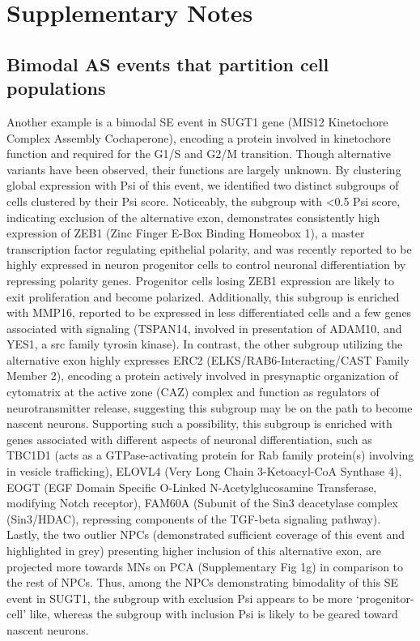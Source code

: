 \section{Supplementary Notes}

\subsection{Bimodal AS events that partition cell populations}

Another example is a bimodal SE event in SUGT1 gene (MIS12 Kinetochore Complex Assembly Cochaperone), encoding a protein involved in kinetochore function and required for the G1/S and G2/M transition. Though alternative variants have been observed, their functions are largely unknown. By clustering global expression with Psi of this event, we identified two distinct subgroups of cells clustered by their Psi score. Noticeably, the subgroup with <0.5 Psi score, indicating exclusion of the alternative exon, demonstrates consistently high expression of ZEB1 (Zinc Finger E-Box Binding Homeobox 1), a master transcription factor regulating epithelial polarity, and was recently reported to be highly expressed in neuron progenitor cells to control neuronal differentiation by repressing polarity genes. Progenitor cells losing ZEB1 expression are likely to exit proliferation and become polarized\cite{Singh:2016iz}. Additionally, this subgroup is enriched with MMP16, reported to be expressed in less differentiated cells\cite{Astarci:2012bk} and a few genes associated with signaling (TSPAN14, involved in presentation of ADAM10, and YES1, a src family tyrosin kinase). In contrast, the other subgroup utilizing the alternative exon highly expresses ERC2 (ELKS/RAB6-Interacting/CAST Family Member 2), encoding a protein actively involved in presynaptic organization of cytomatrix at the active zone (CAZ) complex and function as regulators of neurotransmitter release\cite{Ko:2006gx}, suggesting this subgroup may be on the path to become nascent neurons. Supporting such a possibility, this subgroup is enriched with genes associated with different aspects of neuronal differentiation, such as TBC1D1 (acts as a GTPase-activating protein for Rab family protein(s) involving in vesicle trafficking), ELOVL4 (Very Long Chain 3-Ketoacyl-CoA Synthase 4), EOGT (EGF Domain Specific O-Linked N-Acetylglucosamine Transferase, modifying Notch receptor), FAM60A (Subunit of the Sin3 deacetylase complex (Sin3/HDAC), repressing components of the TGF-beta signaling pathway). Lastly, the two outlier NPCs (demonstrated sufficient coverage of this event and highlighted in grey) presenting higher inclusion of this alternative exon, are projected more towards MNs on PCA (Supplementary Fig 1g) in comparison to the rest of NPCs. Thus, among the NPCs demonstrating bimodality of this SE event in SUGT1, the subgroup with exclusion Psi appears to be more `progenitor-cell' like, whereas the subgroup with inclusion Psi is likely to be geared toward nascent neurons.



